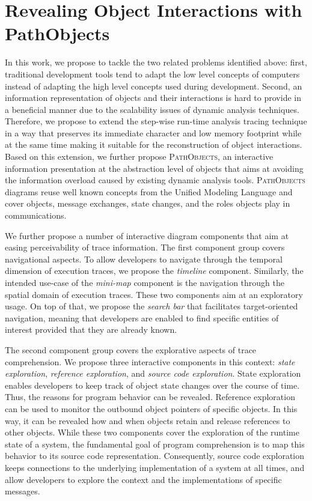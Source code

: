 \section[Revealing Object Interactions with PathObjects]{Revealing Object Interactions with PathObjects%
}
In this work, we propose to tackle the two related problems identified above: first, traditional development tools tend to adapt the low level concepts of computers instead of adapting the high level concepts used during development.
Second, an information representation of objects and their interactions is hard to provide in a beneficial manner due to the scalability issues of dynamic analysis techniques.
Therefore, we propose to extend the step-wise run-time analysis tracing technique in a way that preserves its immediate character and low memory footprint while at the same time making it suitable for the reconstruction of object interactions.
Based on this extension, we further propose \textsc{PathObjects}, an interactive information presentation at the abstraction level of objects that aims at avoiding the information overload caused by existing dynamic analysis tools.
\textsc{PathObjects} diagrams reuse well known concepts from the Unified Modeling Language and cover objects, message exchanges, state changes, and the roles objects play in communications.

We further propose a number of interactive diagram components that aim at easing perceivability of trace information.
The first component group covers navigational aspects.
To allow developers to navigate through the temporal dimension of execution traces, we propose the \emph{timeline} component.
Similarly, the intended use-case of the \emph{mini-map} component is the navigation through the spatial domain of execution traces.
These two components aim at an exploratory usage.
On top of that, we propose the \emph{search bar} that facilitates target-oriented navigation, meaning that developers are enabled to find specific entities of interest provided that they are already known.

The second component group covers the explorative aspects of trace comprehension.
We propose three interactive components in this context: \emph{state exploration}, \emph{reference exploration}, and \emph{source code exploration}.
State exploration enables developers to keep track of object state changes over the course of time.
Thus, the reasons for program behavior can be revealed.
Reference exploration can be used to monitor the outbound object pointers of specific objects.
In this way, it can be revealed how and when objects retain and release references to other objects.
While these two components cover the exploration of the runtime state of a system, the fundamental goal of program comprehension is to map this behavior to its source code representation.
Consequently, source code exploration keeps connections to the underlying implementation of a system at all times, and allow developers to explore the context and the implementations of specific messages.

